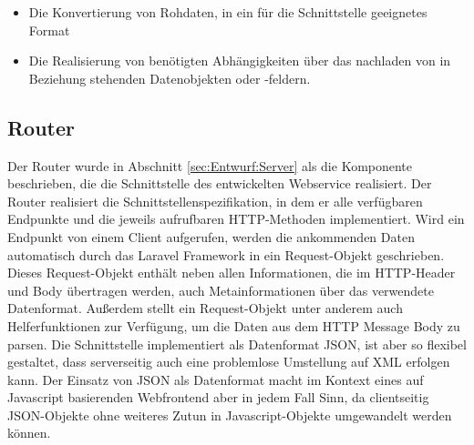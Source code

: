 \begin{itemize}
\item Die Konvertierung von Rohdaten, in ein für die Schnittstelle geeignetes Format
\item Die Realisierung von benötigten Abhängigkeiten über das nachladen von in Beziehung stehenden Datenobjekten oder -feldern.
\end{itemize}

\subsection{Router}

Der Router wurde in Abschnitt \ref{sec:Entwurf:Server} als die Komponente beschrieben, die die Schnittstelle des entwickelten Webservice realisiert. Der Router realisiert die Schnittstellenspezifikation, in dem er alle verfügbaren Endpunkte und die jeweils aufrufbaren HTTP-Methoden implementiert. Wird ein Endpunkt von einem Client aufgerufen, werden die ankommenden Daten automatisch durch das Laravel Framework in ein Request-Objekt geschrieben. Dieses Request-Objekt enthält neben allen Informationen, die im HTTP-Header und Body übertragen werden, auch Metainformationen über das verwendete Datenformat. Außerdem stellt ein Request-Objekt unter anderem auch Helferfunktionen zur Verfügung, um die Daten aus dem HTTP Message Body zu parsen. Die Schnittstelle implementiert als Datenformat \acf{JSON}, ist aber so flexibel gestaltet, dass serverseitig auch eine problemlose Umstellung auf \ac{XML} erfolgen kann. Der Einsatz von \ac{JSON} als Datenformat macht im Kontext eines auf Javascript basierenden Webfrontend aber in jedem Fall Sinn, da clientseitig JSON-Objekte ohne weiteres Zutun in Javascript-Objekte umgewandelt werden können. 

